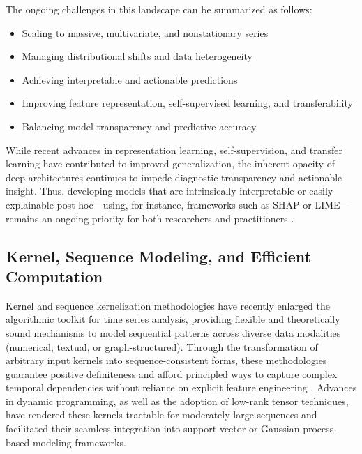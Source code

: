 \documentclass[sigconf]{acmart}
\begin{document}
The ongoing challenges in this landscape can be summarized as follows:

\begin{itemize}
    \item Scaling to massive, multivariate, and nonstationary series
    \item Managing distributional shifts and data heterogeneity
    \item Achieving interpretable and actionable predictions
    \item Improving feature representation, self-supervised learning, and transferability
    \item Balancing model transparency and predictive accuracy
\end{itemize}

While recent advances in representation learning, self-supervision, and transfer learning have contributed to improved generalization, the inherent opacity of deep architectures continues to impede diagnostic transparency and actionable insight. Thus, developing models that are intrinsically interpretable or easily explainable post hoc—using, for instance, frameworks such as SHAP or LIME—remains an ongoing priority for both researchers and practitioners \cite{ref82}.

\subsection{Kernel, Sequence Modeling, and Efficient Computation}

Kernel and sequence kernelization methodologies have recently enlarged the algorithmic toolkit for time series analysis, providing flexible and theoretically sound mechanisms to model sequential patterns across diverse data modalities (numerical, textual, or graph-structured). Through the transformation of arbitrary input kernels into sequence-consistent forms, these methodologies guarantee positive definiteness and afford principled ways to capture complex temporal dependencies without reliance on explicit feature engineering \cite{ref80}. Advances in dynamic programming, as well as the adoption of low-rank tensor techniques, have rendered these kernels tractable for moderately large sequences and facilitated their seamless integration into support vector or Gaussian process-based modeling frameworks.
\end{document}
